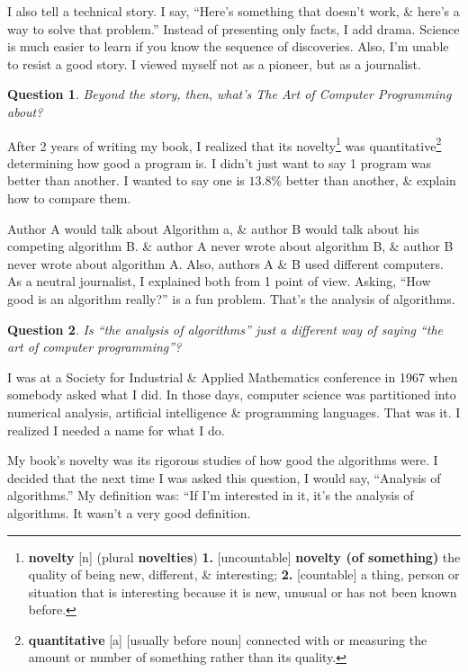 \documentclass[oneside]{book}
\numberwithin{equation}{section}
\newtheorem{question}{Question}[chapter]
\begin{document}
I also tell a technical story. I say, ``Here's something that doesn't work, \& here's a way to solve that problem.'' Instead of presenting only facts, I add drama. Science is much easier to learn if you know the sequence of discoveries. Also, I'm unable to resist a good story. I viewed myself not as a pioneer, but as a journalist.

\begin{question}
	Beyond the story, then, what's \emph{The Art of Computer Programming} about?
\end{question}
After 2 years of writing my book, I realized that its novelty\footnote{\textbf{novelty} [n] (plural \textbf{novelties}) \textbf{1.} [uncountable] \textbf{novelty (of something)} the quality of being new, different, \& interesting; \textbf{2.} [countable] a thing, person or situation that is interesting because it is new, unusual or has not been known before.} was quantitative\footnote{\textbf{quantitative} [a] [usually before noun] connected with or measuring the amount or number of something rather than its quality.} determining how good a program is. I didn't just want to say 1 program was better than another. I wanted to say one is $13.8$\% better than another, \& explain how to compare them.

Author A would talk about Algorithm a, \& author B would talk about his competing algorithm B. \& author A never wrote about algorithm B, \& author B never wrote about algorithm A. Also, authors A \& B used different computers. As a neutral journalist, I explained both from 1 point of view. Asking, ``How good is an algorithm really?'' is a fun problem. That's the analysis of algorithms.

\begin{question}
	Is ``the analysis of algorithms'' just a different way of saying ``the art of computer programming''?
\end{question}
I was at a Society for Industrial \& Applied Mathematics conference in 1967 when somebody asked what I did. In those days, computer science was partitioned into numerical analysis, artificial intelligence \& programming languages. That was it. I realized I needed a name for what I do.

My book's novelty was its rigorous studies of how good the algorithms were. I decided that the next time I was asked this question, I would say, ``Analysis of algorithms.'' My definition was: ``If I'm interested in it, it's the analysis of algorithms. It wasn't a very good definition.
\end{document}
